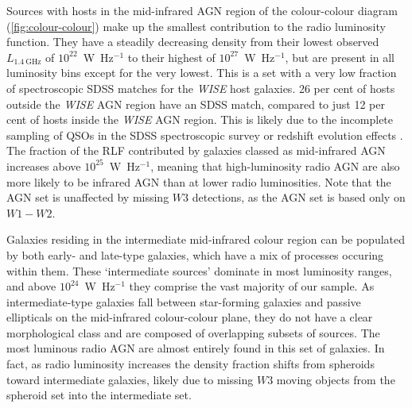       Sources with hosts in the mid-infrared AGN region of the colour-colour diagram (\autoref{fig:colour-colour}) make
      up the smallest contribution to the radio luminosity function. They have
      a steadily decreasing density from their lowest observed $L_{1.4\ \mathrm{GHz}}$ of $10^{22}$~W~Hz$^{-1}$ to their highest of
      $10^{27}$~W~Hz$^{-1}$, but are present in all luminosity bins except for
      the very lowest. This is a set with a very low fraction of spectroscopic SDSS matches for the \emph{WISE} host galaxies. 26 per cent of
      hosts outside the \emph{WISE} AGN region have an SDSS match, compared to just 12 per
      cent of hosts inside the \emph{WISE} AGN region. This is likely due to the incomplete sampling of QSOs in the SDSS spectroscopic survey or redshift evolution effects \citep{strauss02sdss}. The fraction of the RLF contributed by galaxies classed as mid-infrared AGN increases above $10^{25}$~W~Hz$^{-1}$, meaning that high-luminosity radio AGN are also more likely to be infrared AGN than at lower radio luminosities. Note that the AGN set is unaffected by missing $W3$ detections, as the AGN set is based only on $W1-W2$.

      Galaxies residing in the intermediate mid-infrared colour region can be
      populated by both early- and late-type galaxies, which have a mix of
      processes occuring within them. These `intermediate sources' dominate in
      most luminosity ranges, and above $10^{24}$~W~Hz$^{-1}$ they comprise the
      vast majority of our sample. As intermediate-type galaxies fall between
      star-forming galaxies and passive ellipticals on the mid-infrared colour-colour plane, they do
      not have a clear morphological class and are composed of overlapping subsets of sources. The most luminous radio AGN are almost entirely found in
      this set of galaxies. In fact, as radio luminosity increases the density
      fraction shifts from spheroids toward intermediate galaxies, likely due to missing $W3$ moving objects from the spheroid set into the intermediate set.

